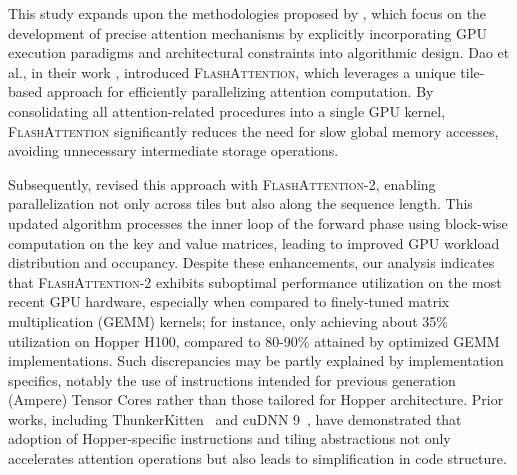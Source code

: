This study expands upon the methodologies proposed by \citet{dao2022flashattention}, which focus on the development of precise attention mechanisms by explicitly incorporating GPU execution paradigms and architectural constraints into algorithmic design. Dao et al., in their work \citep{dao2022flashattention}, introduced \textsc{FlashAttention}, which leverages a unique tile-based approach for efficiently parallelizing attention computation. By consolidating all attention-related procedures into a single GPU kernel, \textsc{FlashAttention} significantly reduces the need for slow global memory accesses, avoiding unnecessary intermediate storage operations.

Subsequently, \citet{dao2023flashattention2} revised this approach with \textsc{FlashAttention-2}, enabling parallelization not only across tiles but also along the sequence length. This updated algorithm processes the inner loop of the forward phase using block-wise computation on the key and value matrices, leading to improved GPU workload distribution and occupancy. Despite these enhancements, our analysis indicates that \textsc{FlashAttention-2} exhibits suboptimal performance utilization on the most recent GPU hardware, especially when compared to finely-tuned matrix multiplication (GEMM) kernels; for instance, only achieving about 35\% utilization on Hopper H100, compared to 80-90\% attained by optimized GEMM implementations. Such discrepancies may be partly explained by implementation specifics, notably the use of instructions intended for previous generation (Ampere) Tensor Cores rather than those tailored for Hopper architecture. Prior works, including ThunkerKitten~\citep{spector2024thunder} and cuDNN 9~\citep{cudnn9}, have demonstrated that adoption of Hopper-specific instructions and tiling abstractions not only accelerates attention operations but also leads to simplification in code structure.


